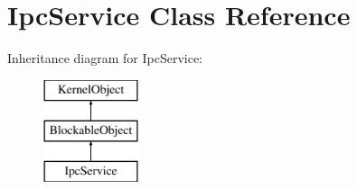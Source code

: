 \hypertarget{class_ipc_service}{}\section{Ipc\+Service Class Reference}
\label{class_ipc_service}
Inheritance diagram for Ipc\+Service\+:\begin{figure}[H]
\begin{center}
\leavevmode
\includegraphics[height=3.000000cm]{class_ipc_service}
\end{center}
\end{figure}
